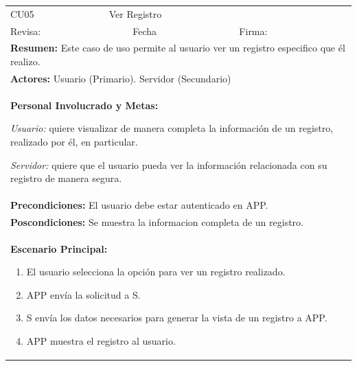 \begin{longtable}{|l|p{5.5cm}|l|p{2cm}|l|p{1.9cm}|} \hline
    \cellcolor{grisOscuro} CU05 & \multicolumn{4}{|l|}{  \cellcolor{grisOscuro} Ver Registro} &  \cellcolor{grisClaro}\multirow{2}{1cm}{} \\ \cline{1-5}
    \cellcolor{grisOscuro} Revisa: &  \cellcolor{grisClaro} &  \cellcolor{grisOscuro} Fecha &  \cellcolor{grisClaro} &  \cellcolor{grisOscuro} Firma: & \cellcolor{grisClaro} \\ \hline
    \multicolumn{6}{|p{15cm}|}{ \textbf{Resumen: } Este caso de uso permite al usuario ver un registro especifico que él realizo.

    } \\ \hline

    \multicolumn{6}{|p{15cm}|}{ \textbf{Actores: } Usuario (Primario). Servidor (Secundario)

    } \\ \hline

    \multicolumn{6}{|p{15cm}|}{ \textbf{Personal Involucrado y Metas: }
    
    \emph{Usuario:} quiere visualizar de manera completa la información de un registro, realizado por él, en particular.

    \emph{Servidor:} quiere que el usuario pueda ver la información relacionada con su registro de manera segura.

    } \\ \hline

    \multicolumn{6}{|p{15cm}|}{ \textbf{Precondiciones: } El usuario debe estar autenticado en APP.

    } \\ \hline

    \multicolumn{6}{|p{15cm}|}{ \textbf{Poscondiciones: } Se muestra la informacion completa de un registro.

    } \\ \hline

    \multicolumn{6}{|p{15cm}|}{ \textbf{Escenario Principal: }

    \begin{enumerate}
        \item El usuario selecciona la opción para ver un registro realizado.
        \item APP envía la solicitud a S.
        \item S envía los datos necesarios para generar la vista de un registro a APP.
        \item APP muestra el registro al usuario.
    \end{enumerate}

}
\end{longtable}
